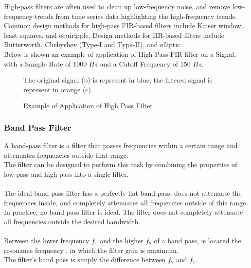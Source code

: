 \documentclass[tesi]{subfiles}
\begin{document}
\noindent High-pass filters are often used to clean up low-frequency noise, and remove low-frequency trends from time series data highlighting the high-frequency trends.\\


\noindent Common design methods for high-pass FIR-based filters include Kaiser window, least squares, and equiripple. Design methods for IIR-based filters include Butterworth, Chebyshev (Type-I and Type-II), and elliptic.\\


\noindent Below is shown an example of application of High-Pass-FIR filter on a Signal, with a Sample Rate of $1000$ $Hz$ and a Cutoff Frequency of $150$ $Hz$.

\newpage
\begin{figure}[H]
\centering	
{}    




The original signal (b) is represent in blue, the filtered signal is represent in orange (c).

 \caption{Example of Application of High Pass Filter}
  \label{fig:Example of Application of Low Pass Filter.}
\end{figure}

\subsubsection{Band Pass Filter} \label{ssc:Band Pass Filter}
A band-pass filter is a filter that passes frequencies within a certain range and attenuates frequencies outside that range.\\
The filter can be designed to perform this task by combining the properties of low-pass and high-pass into a single filter.\\\\
\noindent The ideal band pass filter has a perfectly flat band pass, does not attenuate the frequencies inside, and completely attenuates all frequencies outside of this range.
In practice, no band pass filter is ideal. The filter does not completely attenuate all frequencies outside the desired bandwidth.\\\\
\noindent Between the lower frequency $f_{1}$ and the higher $f_{2}$ of a band pass, is located the resonance frequency , in which the filter gain is maximum. \\
The filter's band pass is simply the difference between $f_{2}$ and $f_{1}$. 
\end{document}
